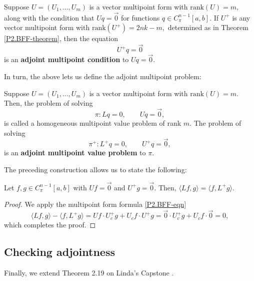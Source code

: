 \documentclass[10pt,reqno,oneside,a4paper]{article}
\begin{document}
\begin{defn}
Suppose $U = (U_1, \ldots, U_m)$ is a vector multipoint form with $\mathrm{rank}(U) = m,$ along with the condition that $Uq = \vec{0}$ for functions $q \in C^{n-1}_{\pi}[a,b].$ If $U^+$ is any vector multipoint form with $\mathrm{rank}(U^+) = 2nk-m,$ determined as in Theorem \ref{P2.BFF-theorem}, then the equation 
\[ 
U^+q = \vec{0}
\]
is an \textbf{adjoint multipoint condition} to $Uq = \vec{0}.$
\end{defn}
In turn, the above lets us define the adjoint multipoint problem:

\begin{defn}
Suppose $U = (U_1, \ldots, U_m)$ is a vector multipoint form with $\mathrm{rank}(U) = m.$ Then, the problem of solving 
\[ \pi: Lq = 0, \qquad Uq = \vec{0},\] 
is called a homogeneous multipoint value problem of rank $m.$ The problem of solving 
\[ \pi^+: L^+q = 0, \qquad U^+q = \vec{0},\] 
is an \textbf{adjoint multipoint value problem} to $\pi.$
\end{defn}
The preceding construction allows us to state the following:

\begin{prop}
Let $f,g \in C^{n-1}_{\pi}[a,b]$ with $Uf = \vec{0}$ and $U^+g = \vec{0}.$ Then, $\langle Lf, g\rangle = \langle f, L^+g\rangle.$
\end{prop}
\begin{proof}
We apply the multipoint form formula \eqref{P2.BFF-eqn}
\[ \langle Lf, g\rangle - \langle f, L^+g\rangle = Uf\cdot U^+_c g + U_c f \cdot U^+ g = \vec{0}\cdot U^+_c g + U_c f \cdot \vec{0} = 0,\]
which completes the proof.
\end{proof}
\subsection{Checking adjointness}
Finally, we extend Theorem 2.19 on Linda's Capstone \cite{linfan}. 
\end{document}
